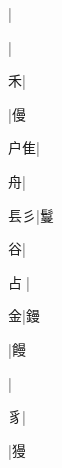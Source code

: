 \begin{multicols}{2}
{{}|{}\par
{}|{}\par
{\cjk{}{\cnsym{}　}{\cnsym{}　}禾}|{}\par
{}|{\cjk{}僈}\par
{\cjk{}{\cnsym{}　}户隹}|{}\par
{\cjk{}{\cnsym{}　}{\cnsym{}　}舟}|{}\par
{\cjk{}{\cnsym{}　}镸彡}|{\cjk{}鬘}\par
{\cjk{}{\cnsym{}　}{\cnsym{}　}谷}|{}\par
{\cjk{}{\cnsym{}　}占{\cnxb{}𠂭}}|{}\par
{\cjk{}{\cnsym{}　}{\cnsym{}　}金}|{\cjk{}鏝}\par
{}|{\cjk{}饅}\par
{}|{}\par
{\cjk{}{\cnsym{}　}{\cnsym{}　}豸}|{}\par
{}|{\cjk{}獌}\par
}
\end{multicols}
